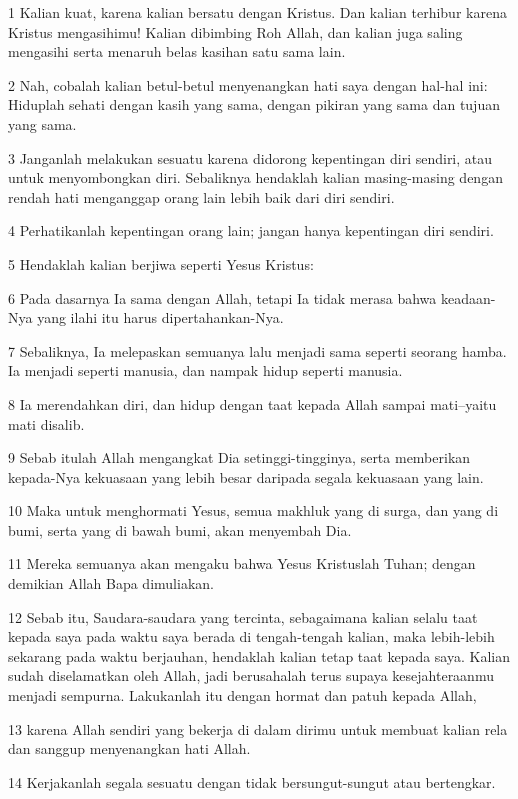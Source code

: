 \par 1 Kalian kuat, karena kalian bersatu dengan Kristus. Dan kalian terhibur karena Kristus mengasihimu! Kalian dibimbing Roh Allah, dan kalian juga saling mengasihi serta menaruh belas kasihan satu sama lain.
\par 2 Nah, cobalah kalian betul-betul menyenangkan hati saya dengan hal-hal ini: Hiduplah sehati dengan kasih yang sama, dengan pikiran yang sama dan tujuan yang sama.
\par 3 Janganlah melakukan sesuatu karena didorong kepentingan diri sendiri, atau untuk menyombongkan diri. Sebaliknya hendaklah kalian masing-masing dengan rendah hati menganggap orang lain lebih baik dari diri sendiri.
\par 4 Perhatikanlah kepentingan orang lain; jangan hanya kepentingan diri sendiri.
\par 5 Hendaklah kalian berjiwa seperti Yesus Kristus:
\par 6 Pada dasarnya Ia sama dengan Allah, tetapi Ia tidak merasa bahwa keadaan-Nya yang ilahi itu harus dipertahankan-Nya.
\par 7 Sebaliknya, Ia melepaskan semuanya lalu menjadi sama seperti seorang hamba. Ia menjadi seperti manusia, dan nampak hidup seperti manusia.
\par 8 Ia merendahkan diri, dan hidup dengan taat kepada Allah sampai mati--yaitu mati disalib.
\par 9 Sebab itulah Allah mengangkat Dia setinggi-tingginya, serta memberikan kepada-Nya kekuasaan yang lebih besar daripada segala kekuasaan yang lain.
\par 10 Maka untuk menghormati Yesus, semua makhluk yang di surga, dan yang di bumi, serta yang di bawah bumi, akan menyembah Dia.
\par 11 Mereka semuanya akan mengaku bahwa Yesus Kristuslah Tuhan; dengan demikian Allah Bapa dimuliakan.
\par 12 Sebab itu, Saudara-saudara yang tercinta, sebagaimana kalian selalu taat kepada saya pada waktu saya berada di tengah-tengah kalian, maka lebih-lebih sekarang pada waktu berjauhan, hendaklah kalian tetap taat kepada saya. Kalian sudah diselamatkan oleh Allah, jadi berusahalah terus supaya kesejahteraanmu menjadi sempurna. Lakukanlah itu dengan hormat dan patuh kepada Allah,
\par 13 karena Allah sendiri yang bekerja di dalam dirimu untuk membuat kalian rela dan sanggup menyenangkan hati Allah.
\par 14 Kerjakanlah segala sesuatu dengan tidak bersungut-sungut atau bertengkar.

